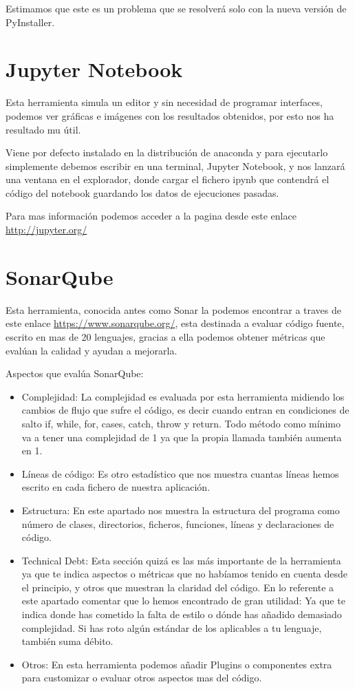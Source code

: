 Estimamos que este es un problema que se resolverá solo con la nueva versión de PyInstaller.
\section{Jupyter Notebook}
\label{notebook:jupiter}

Esta herramienta simula un editor y sin necesidad de programar interfaces, podemos ver gráficas e imágenes con los resultados obtenidos, por esto nos ha resultado mu útil.

Viene por defecto instalado en la distribución de anaconda y para ejecutarlo simplemente debemos escribir en una terminal, Jupyter Notebook, y nos lanzará una ventana en el explorador, donde cargar el fichero ipynb que contendrá el código del notebook guardando los datos de ejecuciones pasadas.


Para mas información podemos acceder a la pagina desde este enlace \url{http://jupyter.org/}

\section{SonarQube}
Esta herramienta, conocida antes como Sonar la podemos encontrar a traves de este enlace \url{https://www.sonarqube.org/}, esta destinada a evaluar código fuente, escrito en mas de 20 lenguajes, gracias a ella podemos obtener métricas que evalúan la calidad y ayudan a mejorarla.

Aspectos que evalúa SonarQube:
\begin{itemize}
	\item Complejidad: La complejidad es evaluada por esta herramienta midiendo los cambios de flujo que sufre el código, es decir cuando entran en condiciones de salto if, while, for, cases, catch, throw y return. Todo método como mínimo va a tener una complejidad de 1 ya que la propia llamada también aumenta en 1.
	\item Líneas de código: Es otro estadístico que nos muestra cuantas líneas hemos escrito en cada fichero de nuestra aplicación.
	\item Estructura: En este apartado nos muestra la estructura del programa como número de clases, directorios, ficheros, funciones, líneas y declaraciones de código.
	\item Technical Debt: Esta sección quizá es las más importante de la herramienta ya que te indica aspectos o métricas que no habíamos tenido en cuenta desde el principio, y otros que muestran la claridad del código.
	En lo referente a este apartado comentar que lo hemos encontrado de gran utilidad: Ya que te indica donde has cometido la falta de estilo o dónde has añadido demasiado complejidad. 
Si has roto algún estándar de los aplicables a tu lenguaje, también suma débito.
	\item Otros: En esta herramienta podemos añadir Plugins o componentes extra para customizar o evaluar otros aspectos mas del código.
\end{itemize}
